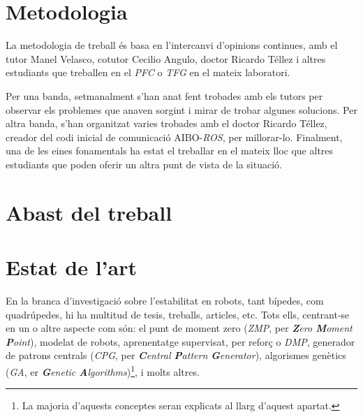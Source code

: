 \documentclass[12pt,a4paper,final,twoside]{report}
\begin{document}
\section{Metodologia}
\label{Metodologia}

La metodologia de treball és basa en l'intercanvi d'opinions continues, amb el tutor Manel Velasco, cotutor Cecilio Angulo, doctor Ricardo Téllez i altres estudiants que treballen en el \textit{PFC} o \textit{TFG} en el mateix laboratori. 

Per una banda, setmanalment s'han anat fent trobades amb els tutors per observar els problemes que anaven sorgint i mirar de trobar algunes solucions. Per altra banda, s'han organitzat varies trobades amb el doctor Ricardo Téllez, creador del codi inicial de comunicació AIBO-\textit{ROS}, per millorar-lo. Finalment, una de les eines fonamentals ha estat el treballar en el mateix lloc que altres estudiants que poden oferir un altra punt de vista de la situació.

\section{Abast del treball}
\label{Abast}

\section{Estat de l'art}
\label{Estat-de-l'art}



En la branca d'investigació sobre l'estabilitat en robots, tant bípedes, com quadrúpedes, hi ha multitud de tesis, treballs, articles, etc. Tots ells, centrant-se en un o altre aspecte com són: el punt de moment zero (\textit{ZMP}, per \textit{\textbf{Z}ero \textbf{M}oment \textbf{P}oint}), modelat de robots, aprenentatge supervisat, per reforç o \textit{DMP}, generador de patrons centrals (\textit{CPG}, per \textit{\textbf{C}entral \textbf{P}attern \textbf{G}enerator}), algorismes genètics (\textit{GA}, er \textit{\textbf{G}enetic \textbf{A}lgorithms})\footnote{La majoria d'aquests conceptes seran explicats al llarg d'aquest apartat.}, i molts altres.
\end{document}
